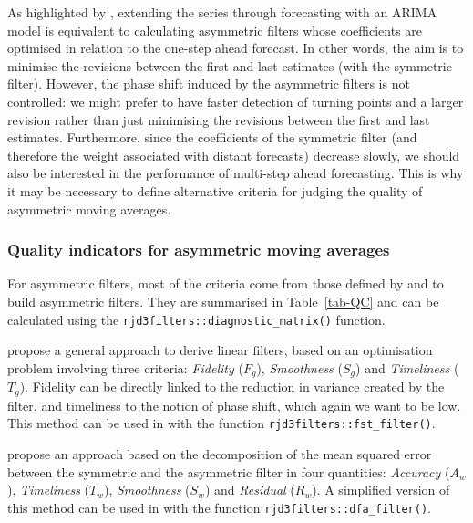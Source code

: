 \documentclass[
]{article}
\newcommand\1{\mathds{1}}
\begin{document}
As highlighted by \textcite{wildischis2004}, extending the series
through forecasting with an ARIMA model is equivalent to calculating
asymmetric filters whose coefficients are optimised in relation to the
one-step ahead forecast. In other words, the aim is to minimise the
revisions between the first and last estimates (with the symmetric
filter). However, the phase shift induced by the asymmetric filters is
not controlled: we might prefer to have faster detection of turning
points and a larger revision rather than just minimising the revisions
between the first and last estimates. Furthermore, since the
coefficients of the symmetric filter (and therefore the weight
associated with distant forecasts) decrease slowly, we should also be
interested in the performance of multi-step ahead forecasting. This is
why it may be necessary to define alternative criteria for judging the
quality of asymmetric moving averages.

\hypertarget{subsec:crit-qual}{%
\subsubsection{Quality indicators for asymmetric moving
averages}\label{subsec:crit-qual}}

For asymmetric filters, most of the criteria come from those defined by
\textcite{ch15HBSA} and \textcite{trilemmaWMR2019} to build asymmetric
filters. They are summarised in Table~\ref{tab-QC} and can be calculated
using the \texttt{rjd3filters::diagnostic\_matrix()} function.

\textcite{ch15HBSA} propose a general approach to derive linear filters,
based on an optimisation problem involving three criteria:
\emph{Fidelity} (\(F_g\)), \emph{Smoothness} (\(S_g\)) and
\emph{Timeliness} (\(T_g\)). Fidelity can be directly linked to the
reduction in variance created by the filter, and timeliness to the
notion of phase shift, which again we want to be low. This method can be
used in with the function
\texttt{rjd3filters::fst\_filter()}.

\textcite{trilemmaWMR2019} propose an approach based on the
decomposition of the mean squared error between the symmetric and the
asymmetric filter in four quantities: \emph{Accuracy} (\(A_w\)),
\emph{Timeliness} (\(T_w\)), \emph{Smoothness} (\(S_w\)) and
\emph{Residual} (\(R_w\)). A simplified version of this method can be
used in  with the function
\texttt{rjd3filters::dfa\_filter()}.
\end{document}
